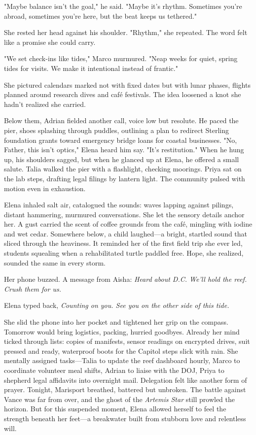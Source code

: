 "Maybe balance isn't the goal," he said. "Maybe it's rhythm. Sometimes you're abroad, sometimes you're here, but the beat keeps us tethered."

She rested her head against his shoulder. "Rhythm," she repeated. The word felt like a promise she could carry.

"We set check-ins like tides," Marco murmured. "Neap weeks for quiet, spring tides for visits. We make it intentional instead of frantic."

She pictured calendars marked not with fixed dates but with lunar phases, flights planned around research dives and café festivals. The idea loosened a knot she hadn't realized she carried.

Below them, Adrian fielded another call, voice low but resolute. He paced the pier, shoes splashing through puddles, outlining a plan to redirect Sterling foundation grants toward emergency bridge loans for coastal businesses. "No, Father, this isn't optics," Elena heard him say. "It's restitution." When he hung up, his shoulders sagged, but when he glanced up at Elena, he offered a small salute. Talia walked the pier with a flashlight, checking moorings. Priya sat on the lab steps, drafting legal filings by lantern light. The community pulsed with motion even in exhaustion.

Elena inhaled salt air, catalogued the sounds: waves lapping against pilings, distant hammering, murmured conversations. She let the sensory details anchor her. A gust carried the scent of coffee grounds from the café, mingling with iodine and wet cedar. Somewhere below, a child laughed—a bright, startled sound that sliced through the heaviness. It reminded her of the first field trip she ever led, students squealing when a rehabilitated turtle paddled free. Hope, she realized, sounded the same in every storm.

Her phone buzzed. A message from Aisha: \textit{Heard about D.C. We'll hold the reef. Crush them for us.}

Elena typed back, \textit{Counting on you. See you on the other side of this tide.}

She slid the phone into her pocket and tightened her grip on the compass. Tomorrow would bring logistics, packing, hurried goodbyes. Already her mind ticked through lists: copies of manifests, sensor readings on encrypted drives, suit pressed and ready, waterproof boots for the Capitol steps slick with rain. She mentally assigned tasks—Talia to update the reef dashboard hourly, Marco to coordinate volunteer meal shifts, Adrian to liaise with the DOJ, Priya to shepherd legal affidavits into overnight mail. Delegation felt like another form of prayer. Tonight, Marisport breathed, battered but unbroken. The battle against Vance was far from over, and the ghost of the \textit{Artemis Star} still prowled the horizon. But for this suspended moment, Elena allowed herself to feel the strength beneath her feet—a breakwater built from stubborn love and relentless will.

